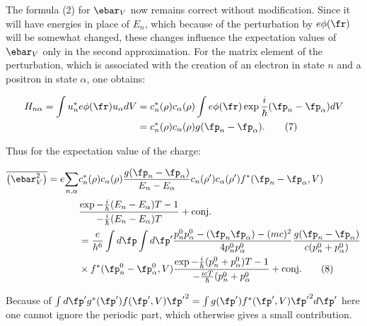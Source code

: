 \documentclass{article}
\newcommand{\nequ}[2]{
\begin{align*}
#1
\tag{#2}
\end{align*}
}
\newcommand{\sumX}[1]{\underset{#1}{\sum}}
\begin{document}
The formula (2) for $\ebar_V$ now remains correct without modification. Since it will have energies in place of $E_n$, which because of the perturbation by $e\phi(\fr)$ will be somewhat changed, these changes influence the expectation values of $\ebar_V$ only in the second approximation. For the matrix element of the perturbation, which is associated with the creation of an electron in state $n$ and a positron in state $\alpha$, one obtains:
\nequ{
H_{n\alpha} = \int u^*_n e\phi(\fr) u_\alpha {dV} 
  &= c^*_n(\rho)c_\alpha(\rho)\int e\phi(\fr)\exp{\frac{i}{\hbar}(\fp_n-\fp_\alpha)}{dV}\\
  &= c^*_n(\rho)c_\alpha(\rho)g(\fp_n-\fp_\alpha).
}{7}
Thus for the expectation value of the charge:
\nequ{
\overline{\left(\ebar^2_V\right)} = e\sumX{n,\alpha}&c^*_n(\rho)c_\alpha(\rho)
    \frac{g(\fp_n - \fp_\alpha)}{E_n - E_\alpha}c_n(\rho')c_\alpha(\rho')
    f^*(\fp_n - \fp_\alpha, V)\\
    &\frac{\exp{-\frac{i}{\hbar}(E_n - E_\alpha)T}-1}{-\frac{i}{\hbar}(E_n - E_\alpha)T} 
      + \text{conj.}\\
    &= \frac{e}{h^6}\int{d\fp}\int{d\fp'}\frac{p^0_n p^0_\alpha - (\fp_n \fp_\alpha) - (mc)^2}
                                              {4p^0_n p^0_\alpha}
                                         \frac{g(\fp_n - \fp_\alpha)}{c(p^0_n + p^0_\alpha)}\\
    &\times f^*(\fp^0_n - \fp^0_\alpha, V)\frac{\exp{-\frac{i}{\hbar}(p^0_n + p^0_\alpha)T}- 1}
                                               {-\frac{icT}{\hbar}(p^0_n + p^0_\alpha} + \text{conj.}
}{8}
Because of $\int{d\fp'}g^*(\fp')f(\fp',V){\fp'}^2 = \int g(\fp')f^*(\fp',V){\fp'}^2 {d\fp'}$ here one cannot ignore the periodic part, which otherwise gives a small contribution.
\end{document}
